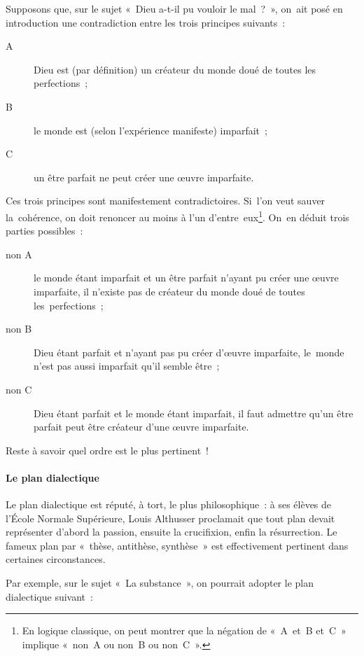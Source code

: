 \documentclass[a4paper,12pt]{article}
\begin{document}
Supposons que, sur le sujet « Dieu a-t-il pu vouloir le mal ? », on ait
posé en introduction une contradiction entre les trois principes
suivants :  

\begin{description}
\item[{A}] Dieu est (par définition) un créateur du monde doué de toutes les
perfections ;
\item[{B}] le monde est (selon l'expérience manifeste) imparfait ;
\item[{C}] un être parfait ne peut créer une œuvre imparfaite.
\end{description}

Ces trois principes sont manifestement contradictoires. Si l'on veut
sauver la cohérence, on doit renoncer au moins à l'un d'entre eux\footnote{En logique classique, on peut montrer que la négation de « A et B
et C » implique « non A ou non B ou non C ».}.
On en déduit trois parties possibles :

\begin{description}
\item[{non A}] le monde étant imparfait et un être parfait n'ayant pu créer
une œuvre imparfaite, il n'existe pas de créateur du monde
doué de toutes les perfections ;
\item[{non B}] Dieu étant parfait et n'ayant pas pu créer d'œuvre
imparfaite, le monde n'est pas aussi imparfait qu'il semble
être ;
\item[{non C}] Dieu étant parfait et le monde étant imparfait, il faut
admettre qu'un être parfait peut être créateur d'une œuvre
imparfaite.
\end{description}

Reste à savoir quel ordre est le plus pertinent ! 


\paragraph{Le plan dialectique}
\label{sec-3-1-4-2}

Le plan dialectique est réputé, à tort, le plus philosophique : à ses
élèves de l'École Normale Supérieure, Louis Althusser proclamait que
tout plan devait représenter d'abord la passion, ensuite la crucifixion,
enfin la résurrection. Le fameux plan par « thèse, antithèse, synthèse »
est effectivement pertinent dans certaines circonstances.

Par exemple, sur le sujet « La substance », on pourrait adopter le plan
dialectique suivant :
\end{document}
